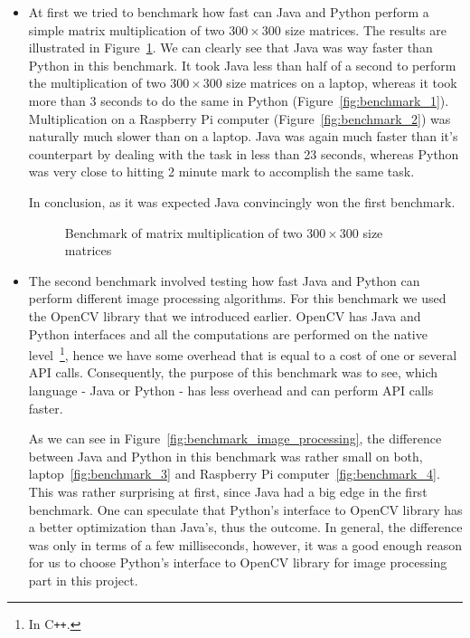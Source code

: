 \begin{itemize}
\item At first we tried to benchmark how fast can Java and Python perform a simple matrix multiplication of two $300 \times 300$ size matrices. The results are illustrated in Figure~\ref{fig:benchmark_multiplication}. We can clearly see that Java was way faster than Python in this benchmark. It took Java less than half of a second to perform the multiplication of two $300 \times 300$ size matrices on a laptop, whereas it took more than 3 seconds to do the same in Python (Figure~\ref{fig:benchmark_1}). Multiplication on a Raspberry Pi computer (Figure~\ref{fig:benchmark_2}) was naturally much slower than on a laptop. Java was again much faster than it's counterpart by dealing with the task in less than 23 seconds, whereas Python was very close to hitting 2 minute mark to accomplish the same task.

In conclusion, as it was expected Java convincingly won the first benchmark.

\begin{figure}[ht]
		\centering
		\quad
		\caption{Benchmark of matrix multiplication of two $300 \times 300$ size matrices}
		\label{fig:benchmark_multiplication}
\end{figure}

\item The second benchmark involved testing how fast Java and Python can perform different image processing algorithms. For this benchmark we used the OpenCV library that we introduced earlier. OpenCV has Java and Python interfaces and all the computations are performed on the native level~\footnote{In C\texttt{++}.}, hence we have some overhead that is equal to a cost of one or several API calls. Consequently, the purpose of this benchmark was to see, which language - Java or Python - has less overhead and can perform API calls faster. 

As we can see in Figure~\ref{fig:benchmark_image_processing}, the difference between Java and Python in this benchmark was rather small on both, laptop~\ref{fig:benchmark_3} and Raspberry Pi computer~\ref{fig:benchmark_4}. This was rather surprising at first, since Java had a big edge in the first benchmark. One can speculate that Python's interface to OpenCV library has a better optimization than Java's, thus the outcome. In general, the difference was only in terms of a few milliseconds, however, it was a good enough reason for us to choose Python's interface to OpenCV library for image processing part in this project.


\end{itemize}
